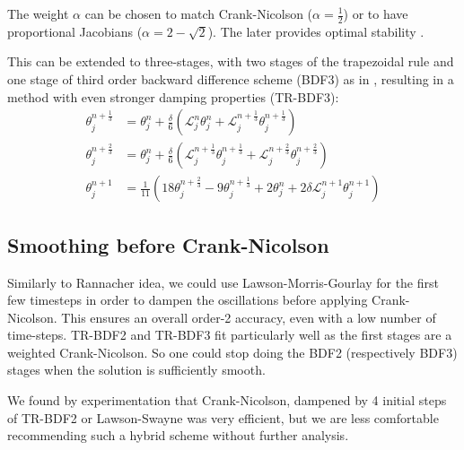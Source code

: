 \documentclass[]{rAMF2e}
\begin{document}
The weight $\alpha$ can be chosen to match Crank-Nicolson ($\alpha=\frac{1}{2}$) or to have proportional Jacobians ($\alpha = 2-\sqrt{2}$). The later provides optimal stability \citep{dharmaraja2009optimal}. 

This can be extended to three-stages, with two stages of the trapezoidal rule and one stage of third order backward difference scheme (BDF3) as in \citep{bathe2005composite}, resulting in a method with even stronger damping properties (TR-BDF3):
\begin{subequations}
\begin{align}
\theta_j^{n+\frac{1}{3}} &= \theta_j^n + \frac{\delta}{6}\left(\mathcal{L}_j^{n} \theta_j^n+\mathcal{L}_j^{n+\frac{1}{3}} \theta_j^{n+\frac{1}{3}}\right)\\
\theta_j^{n+\frac{2}{3}} &= \theta_j^n + \frac{\delta}{6}\left( \mathcal{L}_j^{n+\frac{1}{3}} \theta_j^{n+\frac{1}{3}}+\mathcal{L}_j^{n+\frac{2}{3}} \theta_j^{n+\frac{2}{3}}\right)\\
\theta_j^{n+1} &= \frac{1}{11}\left( 18  \theta_j^{n+\frac{2}{3}} - 9 \theta_j^{n+\frac{1}{3}} + 2 \theta_j^n + 2\delta\mathcal{L}_j^{n+1} \theta_j^{n+1}\right)
\end{align}
\end{subequations}

\subsection{Smoothing before Crank-Nicolson}
Similarly to Rannacher idea, we could use Lawson-Morris-Gourlay for the first few timesteps in order to dampen the oscillations before applying Crank-Nicolson. This ensures an overall order-2 accuracy, even with a low number of time-steps. TR-BDF2 and TR-BDF3 fit particularly well as the first stages are a weighted Crank-Nicolson. So one could stop doing the BDF2 (respectively BDF3) stages when the solution is sufficiently smooth. 

We found by experimentation that Crank-Nicolson, dampened by 4 initial steps of TR-BDF2 or Lawson-Swayne was very efficient, but we are less comfortable recommending such a hybrid scheme without further analysis.
\end{document}
